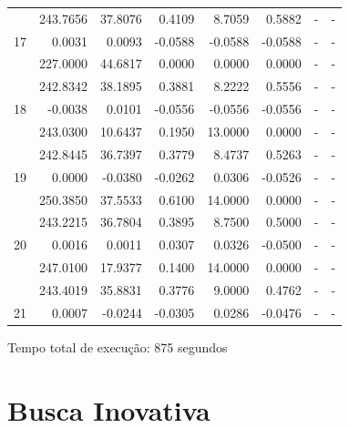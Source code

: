 \begin{table}[htb]
{\begin{tabular}{c|r|r|r|r|r|r|r}
 & 243.7656 & 37.8076 & 0.4109 & 8.7059 & 0.5882 & - & - \\ \cline{2-8} 
\multirow{-3}{*}{17} & \cellcolor[HTML]{ADDDAD}0.0031 & \cellcolor[HTML]{ADDDAD}0.0093 & -0.0588 & -0.0588 & -0.0588 & - & - \\ \hline
 & 227.0000 & 44.6817 & 0.0000 & 0.0000 & 0.0000 & - & - \\ \cline{2-8} 
 & 242.8342 & 38.1895 & 0.3881 & 8.2222 & 0.5556 & - & - \\ \cline{2-8} 
\multirow{-3}{*}{18} & \cellcolor[HTML]{ADDDAD}-0.0038 & \cellcolor[HTML]{ADDDAD}0.0101 & -0.0556 & -0.0556 & -0.0556 & - & - \\ \hline
 & 243.0300 & 10.6437 & 0.1950 & 13.0000 & 0.0000 & - & - \\ \cline{2-8} 
 & 242.8445 & 36.7397 & 0.3779 & 8.4737 & 0.5263 & - & - \\ \cline{2-8} 
\multirow{-3}{*}{19} & \cellcolor[HTML]{ADDDAD}0.0000 & \cellcolor[HTML]{ADDDAD}-0.0380 & \cellcolor[HTML]{ADDDAD}-0.0262 & \cellcolor[HTML]{ADDDAD}0.0306 & -0.0526 & - & - \\ \hline
 & 250.3850 & 37.5533 & 0.6100 & 14.0000 & 0.0000 & - & - \\ \cline{2-8} 
 & 243.2215 & 36.7804 & 0.3895 & 8.7500 & 0.5000 & - & - \\ \cline{2-8} 
\multirow{-3}{*}{20} & \cellcolor[HTML]{ADDDAD}0.0016 & \cellcolor[HTML]{ADDDAD}0.0011 & \cellcolor[HTML]{ADDDAD}0.0307 & \cellcolor[HTML]{ADDDAD}0.0326 & \cellcolor[HTML]{ADDDAD}-0.0500 & - & - \\ \hline
 & 247.0100 & 17.9377 & 0.1400 & 14.0000 & 0.0000 & - & - \\ \cline{2-8} 
 & \cellcolor[HTML]{FFCE93}243.4019 & \cellcolor[HTML]{FFCE93}35.8831 & \cellcolor[HTML]{FFCE93}0.3776 & \cellcolor[HTML]{FFCE93}9.0000 & \cellcolor[HTML]{FFCE93}0.4762 & - & - \\ \cline{2-8} 
\multirow{-3}{*}{21} & \cellcolor[HTML]{ADDDAD}0.0007 & \cellcolor[HTML]{ADDDAD}-0.0244 & \cellcolor[HTML]{ADDDAD}-0.0305 & \cellcolor[HTML]{ADDDAD}0.0286 & \cellcolor[HTML]{ADDDAD}-0.0476 & - & - \\ \hline
\end{tabular}%
}
\end{table}

Tempo total de execução: 875 segundos

\pagebreak
\section{Busca Inovativa}

